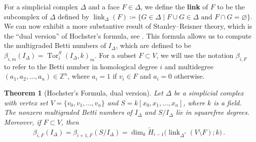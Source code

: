 \documentclass[12pt,leqno]{amsart}
\newtheorem{theorem}[lemma]{Theorem}
\theoremstyle{definition}
\begin{document}
%
For a simplicial complex $\Delta$ and a face $F \in \Delta$, we define the
\textbf{link} of $F$ to be the subcomplex of $\Delta$ defined by
$\operatorname{link}_\Delta(F) \coloneq \{ G \in \Delta \mathrel{|}
\text{$F \cup G \in \Delta$ and $F \cap G = \varnothing$} \}$. We can now
exhibit a more substantive result of Stanley--Reisner theory, which is the
``dual version'' of Hochster's formula, see \cite[Corollary~1.40]{MS}. This
formula allows us to compute the multigraded Betti numbers of $I_\Delta$,
which are defined to be
$\beta_{i,m}(I_\Delta) = \operatorname{Tor}_i^S(I_\Delta, k)_m$. For a subset
$F \subset V$, we will use the notation $\beta_{i,F}$ to refer to the Betti
number in homological degree $i$ and multidegree
$(a_1, a_2, \dotsc, a_n) \in \mathbb{Z}^n$, where $a_i = 1$ if $v_i \in F$ and
$a_i = 0$ otherwise.
%
\begin{theorem}[Hochster's Formula, dual version]
  Let $\Delta$ be a simplicial complex with vertex set
  $V = \{v_0,v_1,\dotsc,v_n\}$ and $S = k[x_0,x_1,\dotsc,x_n]$, where $k$ is a
  field. The nonzero multigraded Betti numbers of $I_\Delta$ and $S/I_\Delta$
  lie in squarefree degrees. Moreover, if $F \subset V$, then
  \[
    \beta_{i,F} (I_\Delta) = \beta_{i+1,F} (S/I_\Delta) = \dim_k \widetilde
    H_{i-1} \big( \operatorname{link}_{\Delta^*}(V \setminus F); k \big) \, .
  \]
\end{theorem}
%
\end{document}
